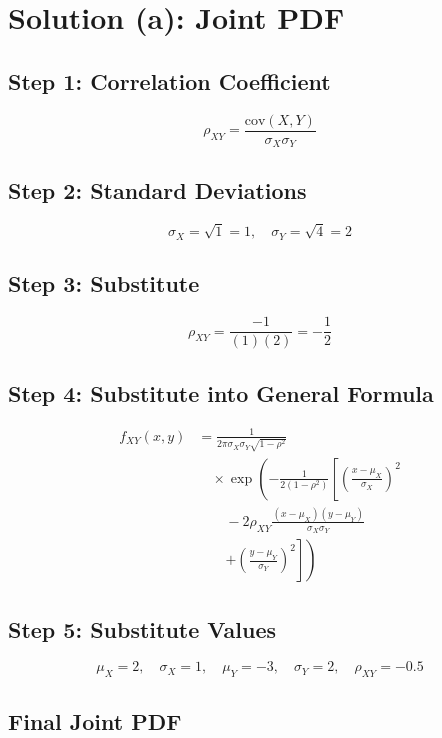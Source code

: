 \documentclass[12pt]{article}
\begin{document}
\section*{Solution (a): Joint PDF}

\subsection*{Step 1: Correlation Coefficient}

\[
\rho_{XY} = \frac{\text{cov}(X,Y)}{\sigma_X \sigma_Y}
\]

\subsection*{Step 2: Standard Deviations}

\[
\sigma_X = \sqrt{1} = 1, \quad \sigma_Y = \sqrt{4} = 2
\]

\subsection*{Step 3: Substitute}

\[
\rho_{XY} = \frac{-1}{(1)(2)} = -\frac{1}{2}
\]

\subsection*{Step 4: Substitute into General Formula}

\[
\begin{aligned}
f_{XY}(x,y) &=
\frac{1}{2\pi \sigma_X \sigma_Y \sqrt{1-\rho^2}} \\
&\quad \times \exp \left(
-\frac{1}{2(1-\rho^2)}
\left[
\left(\frac{x-\mu_X}{\sigma_X}\right)^2
\right.\right. \\
&\qquad -2\rho_{XY}\frac{(x-\mu_X)(y-\mu_Y)}{\sigma_X\sigma_Y} \\
&\qquad \left.\left.
+
\left(\frac{y-\mu_Y}{\sigma_Y}\right)^2
\right]
\right)
\end{aligned}
\]

\subsection*{Step 5: Substitute Values}

\[
\mu_X = 2,\quad \sigma_X = 1,\quad \mu_Y = -3,\quad \sigma_Y = 2,\quad \rho_{XY} = -0.5
\]

\subsection*{Final Joint PDF}
\end{document}
